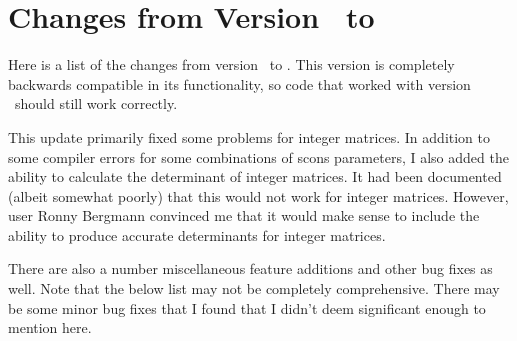 
\section{Changes from Version \prevtmvversion\ to \tmvversion}
\label{Changes}

Here is a list of the changes from version \prevtmvversion\ to \tmvversion.  
This version is completely backwards compatible in its functionality, so code that worked
with version \prevtmvversion\ should still work correctly.

This update primarily fixed some problems for integer matrices.  In addition to some compiler
errors for some combinations of scons parameters, I also added the ability to calculate the 
determinant of integer matrices.  It had been documented (albeit somewhat poorly) that 
this would not work for integer matrices.  However, user Ronny Bergmann convinced me that
it would make sense to include the ability to produce accurate determinants for integer matrices.

There are also a number miscellaneous feature additions and other bug fixes as well.
Note that the below list may not be completely comprehensive.  
There may be some minor bug fixes that I 
found that I didn't deem significant enough to mention here.


